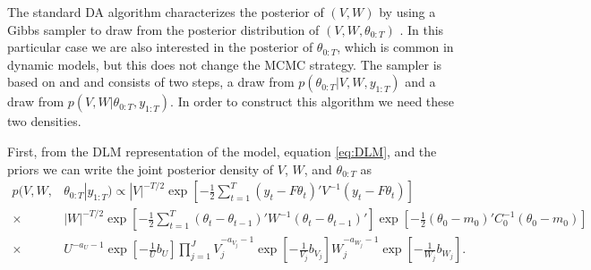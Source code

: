 \documentclass[graybox]{svmult}
\begin{document}
The standard DA algorithm characterizes the posterior of $(V,W)$ by using a Gibbs sampler to draw from the posterior distribution of $(V,W,\theta_{0:T})$ \citep{tanner1987calculation}. In this particular case we are also interested in the posterior of $\theta_{0:T}$, which is common in dynamic models, but this does not change the MCMC strategy. The sampler is based on \citet{fruhwirth1994data} and \citet{carter1994gibbs} and consists of two steps, a draw from $p(\theta_{0:T}|V,W,y_{1:T})$ and a draw from $p(V,W|\theta_{0:T},y_{1:T})$. In order to construct this algorithm we need these two densities.

First, from the DLM representation of the model, equation \eqref{eq:DLM}, and the priors we can write the joint posterior density of $V$, $W$, and $\theta_{0:T}$ as
\begin{align}
p(V,W,&\theta_{0:T}|y_{1:T}) \propto |V|^{-T/2}\exp\left[-\frac{1}{2}\sum_{t=1}^T(y_t - F\theta_t)'V^{-1}(y_t - F\theta_t)\right]\nonumber\\
\times&|W|^{-T/2}\exp\left[-\frac{1}{2}\sum_{t=1}^T(\theta_t - \theta_{t-1})'W^{-1}(\theta_t - \theta_{t-1})'\right]\exp\left[-\frac{1}{2}(\theta_0-m_0)'C_0^{-1}(\theta_0-m_0)\right]\nonumber\\
\times& U^{-a_{U} - 1}\exp\left[-\frac{1}{U}b_{U}\right]\prod_{j=1}^JV_j^{-a_{V_j} - 1}\exp\left[-\frac{1}{V_j}b_{V_j}\right]W_j^{-a_{W_j} - 1}\exp\left[-\frac{1}{W_j}b_{W_j}\right].\label{eq:post}
\end{align}
\end{document}
